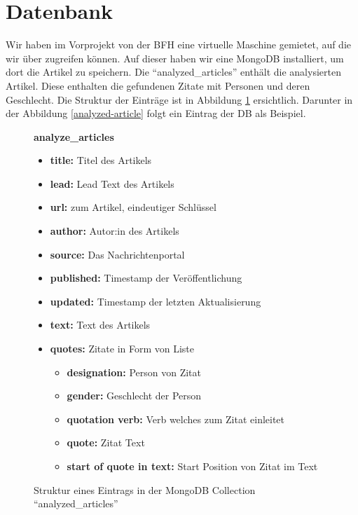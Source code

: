 \newpage
\section{Datenbank}\label{db-design}
Wir haben im Vorprojekt von der BFH eine virtuelle Maschine gemietet, auf die wir über  zugreifen können.
Auf dieser haben wir eine MongoDB installiert, um dort die Artikel zu speichern.
Die  \enquote{analyzed\_articles} enthält die analysierten Artikel.
Diese enthalten die gefundenen Zitate mit Personen und deren Geschlecht.
Die Struktur der Einträge ist in Abbildung \ref{structure-analyzed-articles} ersichtlich.
Darunter in der Abbildung \ref{analyzed-article} folgt ein Eintrag der DB als Beispiel.

\begin{figure}[H]
\textbf{analyze\_articles}
\begin{itemize}
    \item \textbf{title:} Titel des Artikels
    \item \textbf{lead:} Lead Text des Artikels
    \item \textbf{url:}  zum Artikel, eindeutiger Schlüssel
    \item \textbf{author:} Autor:in des Artikels
    \item \textbf{source:} Das Nachrichtenportal
    \item \textbf{published:} Timestamp der Veröffentlichung
    \item \textbf{updated:} Timestamp der letzten Aktualisierung
    \item \textbf{text:} Text des Artikels
    \item \textbf{quotes:} Zitate in Form von Liste
    \begin{itemize}
        \item \textbf{designation:} Person von Zitat
        \item \textbf{gender:} Geschlecht der Person
        \item \textbf{quotation verb:} Verb welches zum Zitat einleitet
        \item \textbf{quote:} Zitat Text
        \item \textbf{start of quote in text:} Start Position von Zitat im Text
    \end{itemize}
\end{itemize}
\caption{Struktur eines Eintrags in der MongoDB Collection \enquote{analyzed\_articles}}
\label{structure-analyzed-articles}
\end{figure}

